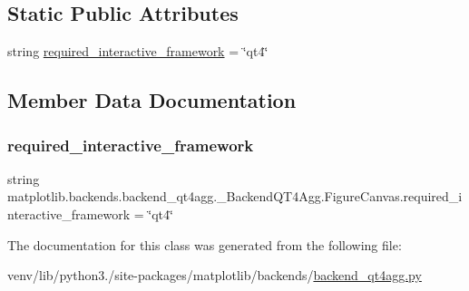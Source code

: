 \subsection*{Static Public Attributes}
\begin{DoxyCompactItemize}
\item 
string \hyperlink{classmatplotlib_1_1backends_1_1backend__qt4agg_1_1__BackendQT4Agg_1_1FigureCanvas_a5ec9b9e9b606b5ce44dea591b00ec79c}{required\+\_\+interactive\+\_\+framework} = \char`\"{}qt4\char`\"{}
\end{DoxyCompactItemize}


\subsection{Member Data Documentation}
\mbox{\label{classmatplotlib_1_1backends_1_1backend__qt4agg_1_1__BackendQT4Agg_1_1FigureCanvas_a5ec9b9e9b606b5ce44dea591b00ec79c}} 
\subsubsection{\texorpdfstring{required\+\_\+interactive\+\_\+framework}{required\_interactive\_framework}}
{\footnotesize\ttfamily string matplotlib.\+backends.\+backend\+\_\+qt4agg.\+\_\+\+Backend\+Q\+T4\+Agg.\+Figure\+Canvas.\+required\+\_\+interactive\+\_\+framework = \char`\"{}qt4\char`\"{}\hspace{0.3cm}{\ttfamily [static]}}



The documentation for this class was generated from the following file\+:\begin{DoxyCompactItemize}
\item 
venv/lib/python3./site-\/packages/matplotlib/backends/\hyperlink{backend__qt4agg_8py}{backend\+\_\+qt4agg.\+py}\end{DoxyCompactItemize}
